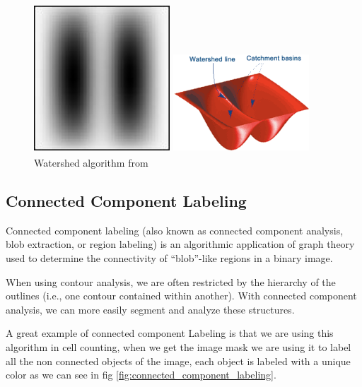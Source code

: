 \begin{figure}[H]
\centering
\begin{minipage}{.33\textwidth}
  \centering
  \centerline{\includegraphics[width = 2in]{../images/watershed_example.jpg}}
\end{minipage}

\begin{minipage}{.33\textwidth}
  \centering
  \centerline{\includegraphics[width = 2in]{../images/watershed_relief.png}}
\end{minipage}
  \caption{Watershed algorithm from \textsuperscript{\cite{Steve_Eddins_2022_mathworks}}}
\end{figure}

\subsection{Connected Component Labeling}
\hspace{\parindent}
Connected component labeling (also known as connected component analysis, blob extraction, or region labeling) is an algorithmic application of graph theory used to determine the connectivity of “blob”-like regions in a binary image.

When using contour analysis, we are often restricted by the hierarchy of the outlines (i.e., one contour contained within another). With connected component analysis, we can more easily segment and analyze these structures.

A great example of connected component Labeling is that we are using this algorithm in cell counting, when we get the image mask we are using it to label all the non connected objects of the image, each object is labeled with a unique color as we can see in fig \ref{fig:connected_component_labeling}.

